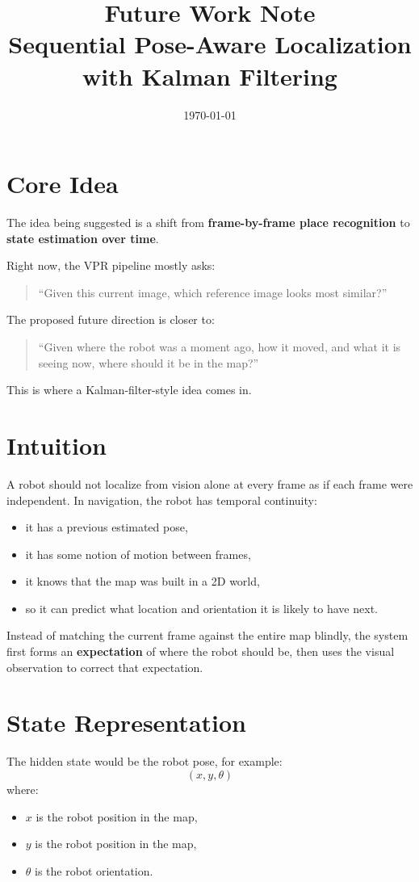 \documentclass[11pt]{article}
\title{\textbf{Future Work Note}\\[4pt]
Sequential Pose-Aware Localization with Kalman Filtering}
\author{}
\date{\today}
\begin{document}
\maketitle

\section*{Core Idea}
The idea being suggested is a shift from \textbf{frame-by-frame place recognition} to \textbf{state estimation over time}.

Right now, the VPR pipeline mostly asks:
\begin{quote}
``Given this current image, which reference image looks most similar?''
\end{quote}

The proposed future direction is closer to:
\begin{quote}
``Given where the robot was a moment ago, how it moved, and what it is seeing now, where should it be in the map?''
\end{quote}

This is where a Kalman-filter-style idea comes in.

\section*{Intuition}
A robot should not localize from vision alone at every frame as if each frame were independent. In navigation, the robot has temporal continuity:

\begin{itemize}[leftmargin=*]
  \item it has a previous estimated pose,
  \item it has some notion of motion between frames,
  \item it knows that the map was built in a 2D world,
  \item so it can predict what location and orientation it is likely to have next.
\end{itemize}

Instead of matching the current frame against the entire map blindly, the system first forms an \textbf{expectation} of where the robot should be, then uses the visual observation to correct that expectation.

\section*{State Representation}
The hidden state would be the robot pose, for example:
\[
(x, y, \theta)
\]
where:
\begin{itemize}[leftmargin=*]
  \item $x$ is the robot position in the map,
  \item $y$ is the robot position in the map,
  \item $\theta$ is the robot orientation.
\end{itemize}
\end{document}
